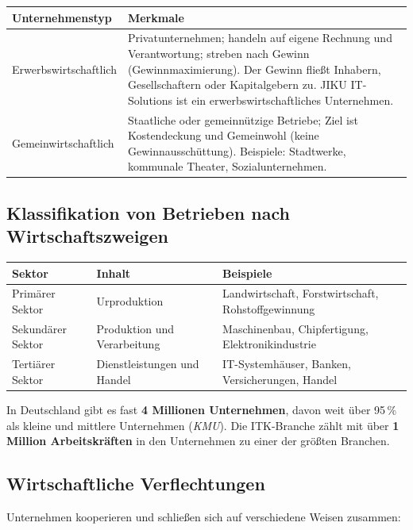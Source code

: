 \documentclass[11pt, a4paper]{article}
\begin{document}
\begin{center}
\begin{tabular}{p{4.5cm} p{8.5cm}}
\toprule
\textbf{Unternehmenstyp} & \textbf{Merkmale}\\
\midrule
Erwerbswirtschaftlich & Privatunternehmen; handeln auf eigene Rechnung und Verantwortung;
streben nach Gewinn (Gewinnmaximierung). Der Gewinn fließt Inhabern,
Gesellschaftern oder Kapitalgebern zu. JIKU IT-Solutions ist ein
erwerbswirtschaftliches Unternehmen.\\
\addlinespace
Gemeinwirtschaftlich & Staatliche oder gemeinnützige Betriebe; Ziel ist Kostendeckung und
Gemeinwohl (keine Gewinnausschüttung). Beispiele: Stadtwerke,
kommunale Theater, Sozialunternehmen.\\
\bottomrule
\end{tabular}
\end{center}

\subsection{Klassifikation von Betrieben nach Wirtschaftszweigen}

\begin{center}
\begin{tabular}{p{3.5cm} p{4.5cm} p{5cm}}
\toprule
\textbf{Sektor} & \textbf{Inhalt} & \textbf{Beispiele}\\
\midrule
Primärer Sektor & Urproduktion & Landwirtschaft, Forstwirtschaft, Rohstoffgewinnung\\
Sekundärer Sektor & Produktion und Verarbeitung & Maschinenbau, Chipfertigung, Elektronikindustrie\\
Tertiärer Sektor & Dienstleistungen und Handel & IT-Systemhäuser, Banken, Versicherungen, Handel\\
\bottomrule
\end{tabular}
\end{center}

In Deutschland gibt es fast \textbf{4 Millionen Unternehmen}, davon weit über 95\,\% als kleine und mittlere
Unternehmen (\emph{KMU}). Die ITK-Branche zählt mit über \textbf{1 Million Arbeitskräften} in den
Unternehmen zu einer der größten Branchen.

\subsection{Wirtschaftliche Verflechtungen}

Unternehmen kooperieren und schließen sich auf verschiedene Weisen zusammen:
\end{document}
